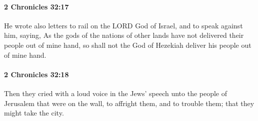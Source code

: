 		\paragraph{2 Chronicles 32:17} %
			\label{2CHRONICLES-32-17}

			He wrote also letters to rail on the LORD God of Israel, and to speak against him, saying, As the gods of the nations of other lands have not delivered their people out of mine hand, so shall not the God of Hezekiah deliver his people out of mine hand.


		\paragraph{2 Chronicles 32:18} %
			\label{2CHRONICLES-32-18}

			Then they cried with a loud voice in the Jews' speech unto the people of Jerusalem that were on the wall, to affright them, and to trouble them; that they might take the city.

